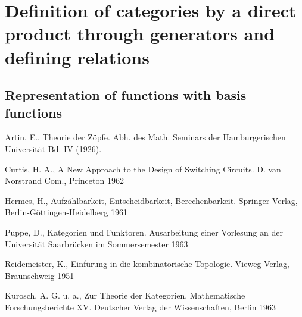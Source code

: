 \documentclass{article}
\begin{document}
\section{Definition of categories by a direct product through generators and defining relations}
\subsection{Representation of functions with basis functions}
\label{basis-function-representation}

\begin{thebibliography}{9}
Artin, E., Theorie der Zöpfe. Abh. des Math. Seminars der Hamburgerischen Universit\"{a}t Bd. IV (1926).

Curtis, H. A., A New Approach to the Design of Switching Circuits. D. van Norstrand Com., Princeton 1962

Hermes, H., Aufz\"{a}hlbarkeit, Entscheidbarkeit, Berechenbarkeit. Springer-Verlag, Berlin-G\"{o}ttingen-Heidelberg 1961

Puppe, D., Kategorien und Funktoren. Ausarbeitung einer Vorlesung an der Universit\"{a}t Saarbr\"{u}cken im Sommersemester 1963

Reidemeister, K., Einf\"{u}rung in die kombinatorische Topologie. Vieweg-Verlag, Braunschweig 1951

Kurosch, A. G. u. a., Zur Theorie der Kategorien. Mathematische Forschungsberichte XV. Deutscher Verlag der Wissenschaften, Berlin 1963
\end{thebibliography}
\end{document}
